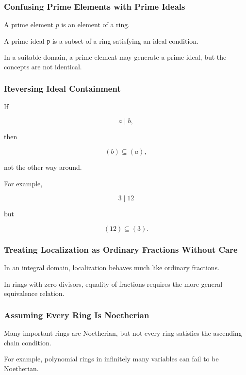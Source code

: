\subsubsection{Confusing Prime Elements with Prime Ideals}

A prime element \(p\) is an element of a ring.

A prime ideal \(\mathfrak p\) is a subset of a ring satisfying an ideal
condition.

In a suitable domain, a prime element may generate a prime ideal, but the
concepts are not identical.

\subsubsection{Reversing Ideal Containment}

If

\[ a\mid b, \]

then

\[ (b)\subseteq(a), \]

not the other way around.

For example,

\[ 3\mid12 \]

but

\[ (12)\subseteq(3). \]

\subsubsection{Treating Localization as Ordinary Fractions Without Care}

In an integral domain, localization behaves much like ordinary fractions.

In rings with zero divisors, equality of fractions requires the more general
equivalence relation.

\subsubsection{Assuming Every Ring Is Noetherian}

Many important rings are Noetherian, but not every ring satisfies the
ascending chain condition.

For example, polynomial rings in infinitely many variables can fail to be
Noetherian.

